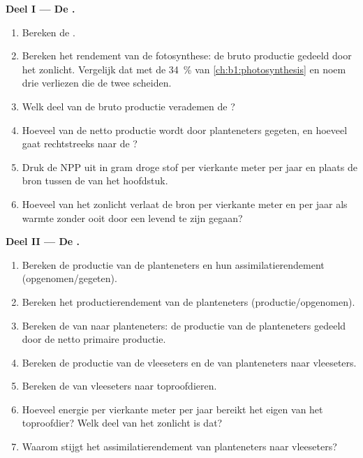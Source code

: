 \begin{problem}
\medskip
\noindent\textbf{Deel I --- De .}
\begin{enumerate}
  \item Bereken de .
  \item Bereken het rendement van de fotosynthese: de bruto productie
        gedeeld door het zonlicht. Vergelijk dat met de \qty{34}{\%} van
        \cref{ch:b1:photosynthesis} en noem drie verliezen die de twee
        scheiden.
  \item Welk deel van de bruto productie verademen de ?
  \item Hoeveel van de netto productie wordt door planteneters gegeten,
        en hoeveel gaat rechtstreeks naar de ?
  \item Druk de NPP uit in gram droge stof per vierkante meter per jaar
        en plaats de bron tussen de  van het hoofdstuk.
  \item Hoeveel van het zonlicht verlaat de bron per vierkante meter en
        per jaar als warmte zonder ooit door een levend  te zijn
        gegaan?
\end{enumerate}

\medskip
\noindent\textbf{Deel II --- De .}
\begin{enumerate}[resume]
  \item Bereken de productie van de planteneters en hun
        assimilatierendement (opgenomen/gegeten).
  \item Bereken het productierendement van de planteneters
        (productie/opgenomen).
  \item Bereken de  van  naar
        planteneters: de productie van de planteneters gedeeld door de
        netto primaire productie.
  \item Bereken de productie van de vleeseters en de  van planteneters naar vleeseters.
  \item Bereken de  van vleeseters naar
        toproofdieren.
  \item Hoeveel energie per vierkante meter per jaar bereikt het eigen
         van het toproofdier? Welk deel van het zonlicht is dat?
  \item Waarom stijgt het assimilatierendement van planteneters naar
        vleeseters?
\end{enumerate}


\end{problem}
